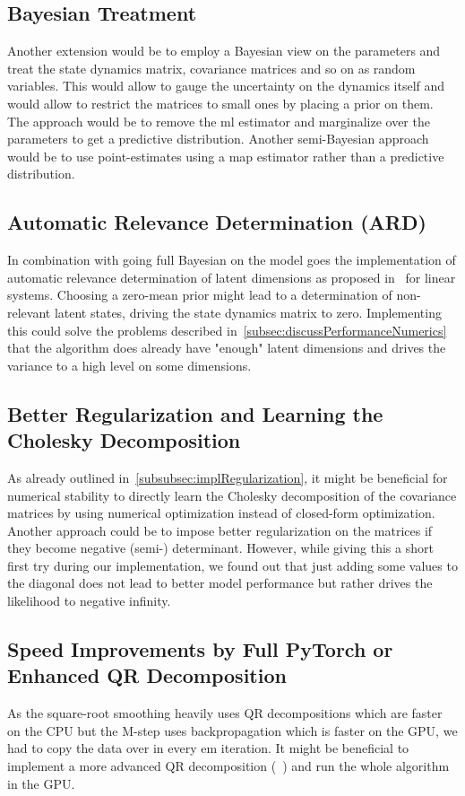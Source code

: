 	\subsection{Bayesian Treatment}
		Another extension would be to employ a Bayesian view on the parameters and treat \eg the state dynamics matrix, covariance matrices and so on as random variables. This would allow to gauge the uncertainty on the dynamics itself and would allow to restrict the matrices to small ones by placing a prior on them. The approach would be to remove the \ac{ml} estimator and marginalize over the parameters to get a predictive distribution. Another semi-Bayesian approach would be to use point-estimates using a \ac{map} estimator rather than a predictive distribution.

	\subsection{Automatic Relevance Determination (ARD)}
		\label{subsec:ard}

		In combination with going full Bayesian on the model goes the implementation of automatic relevance determination of latent dimensions as proposed in~\cite{bealVariationalKalmanSmoother2000} for linear systems. Choosing a zero-mean prior might lead to a determination of non-relevant latent states, driving the state dynamics matrix to zero. Implementing this could solve the problems described in~\autoref{subsec:discussPerformanceNumerics} that the algorithm does already have "enough" latent dimensions and drives the variance to a high level on some dimensions.

	\subsection{Better Regularization and Learning the Cholesky Decomposition}
		As already outlined in~\autoref{subsubsec:implRegularization}, it might be beneficial for numerical stability to directly learn the Cholesky decomposition of the covariance matrices by using numerical optimization instead of closed-form optimization. Another approach could be to impose better regularization on the matrices if they become negative (semi-) determinant. However, while giving this a short first try during our implementation, we found out that just adding some values to the diagonal does not lead to better model performance but rather drives the likelihood to negative infinity.

	\subsection{Speed Improvements by Full PyTorch or Enhanced QR Decomposition}
		As the square-root smoothing heavily uses QR decompositions which are faster on the CPU but the M-step uses backpropagation which is faster on the GPU, we had to copy the data over in every \ac{em} iteration. It might be beneficial to implement a more advanced QR decomposition (\eg~\cite{andersonCommunicationAvoidingQRDecomposition2011a}) and run the whole algorithm in the GPU.

